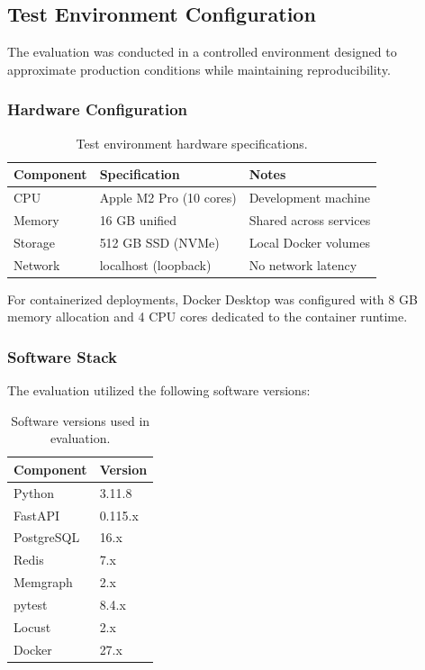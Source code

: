 \subsection{Test Environment Configuration}

The evaluation was conducted in a controlled environment designed to approximate production conditions while maintaining reproducibility.

\subsubsection{Hardware Configuration}

\begin{table}[ht]
\centering
\caption{Test environment hardware specifications.}
\label{tab:eval-hardware}
\small
\begin{tabular}{lll}
\hline
\textbf{Component} & \textbf{Specification} & \textbf{Notes} \\
\hline
CPU & Apple M2 Pro (10 cores) & Development machine \\
Memory & 16 GB unified & Shared across services \\
Storage & 512 GB SSD (NVMe) & Local Docker volumes \\
Network & localhost (loopback) & No network latency \\
\hline
\end{tabular}
\end{table}

For containerized deployments, Docker Desktop was configured with 8 GB memory allocation and 4 CPU cores dedicated to the container runtime.

\subsubsection{Software Stack}

The evaluation utilized the following software versions:

\begin{table}[ht]
\centering
\caption{Software versions used in evaluation.}
\label{tab:eval-software}
\small
\begin{tabular}{ll}
\hline
\textbf{Component} & \textbf{Version} \\
\hline
Python & 3.11.8 \\
FastAPI & 0.115.x \\
PostgreSQL & 16.x \\
Redis & 7.x \\
Memgraph & 2.x \\
pytest & 8.4.x \\
Locust & 2.x \\
Docker & 27.x \\
\hline
\end{tabular}
\end{table}

